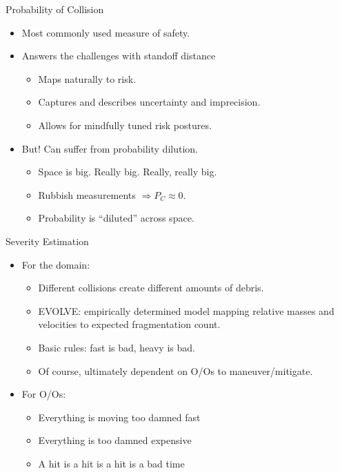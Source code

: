 \documentclass[pdf]{beamer}
\begin{document}
\begin{frame}{Probability of Collision}
  \begin{itemize}
  \item Most commonly used measure of safety.

  \item Answers the challenges with standoff distance
    \begin{itemize}
    \item Maps naturally to risk.
    \item Captures and describes uncertainty and imprecision.
    \item Allows for mindfully tuned risk postures.
    \end{itemize}

  \item But! Can suffer from probability dilution.
    \begin{itemize}
    \item Space is big. Really big. Really, really big.
    \item Rubbish measurements $\Rightarrow P_C \approx 0$.
    \item Probability is ``diluted'' across space.
    \end{itemize}
  \end{itemize}
\end{frame}

\begin{frame}{Severity Estimation}
  \begin{itemize}
  \item For the domain:
    \begin{itemize}
    \item Different collisions create different amounts of debris.
    \item EVOLVE: empirically determined model mapping relative masses and
      velocities to expected fragmentation count.
    \item Basic rules: fast is bad, heavy is bad.
    \item Of course, ultimately dependent on O/Os to maneuver/mitigate.
    \end{itemize}

  \item For O/Os:
    \begin{itemize}
    \item Everything is moving too damned fast
    \item Everything is too damned expensive
    \item A hit is a hit is a hit is a bad time
    \end{itemize}
  \end{itemize}
\end{frame}
\end{document}
